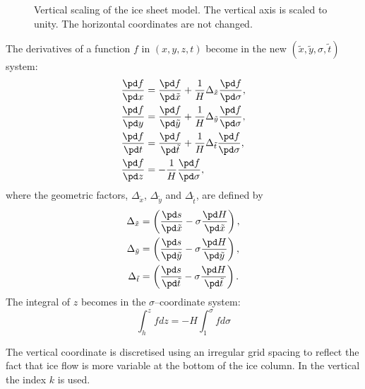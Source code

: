 \begin{figure}[htbp]
  \begin{center}
    
    \caption[Vertical scaling of the ice sheet model.]{Vertical scaling of the ice sheet model. The vertical axis is scaled to unity. The horizontal coordinates are not changed.}
    \label{kin.fig.scale}
  \end{center}
\end{figure}


The derivatives of a function $f$ in $(x,y,z,t)$ become in the new $(\tilde{x},\tilde{y},\sigma,\tilde{t})$ system:
\begin{subequations}
  \begin{align}
    \frac{\pd f}{\pd x} &= \frac{\pd f}{\pd\tilde{x}}+\frac1H\Delta_{\tilde{x}}\frac{\pd f}{\pd \sigma},\\
    \frac{\pd f}{\pd y} &= \frac{\pd f}{\pd\tilde{y}}+\frac1H\Delta_{\tilde{y}}\frac{\pd f}{\pd \sigma},\\
    \frac{\pd f}{\pd t} &= \frac{\pd f}{\pd\tilde{t}}+\frac1H\Delta_{\tilde{t}}\frac{\pd f}{\pd \sigma},\\
    \frac{\pd f}{\pd z} &= -\frac1H\frac{\pd f}{\pd\sigma},
  \end{align}
\end{subequations}
where  the geometric factors, $\Delta_{\tilde{x}}$, $\Delta_{\tilde{y}}$ and $\Delta_{\tilde{t}}$, are defined by
\begin{subequations}
  \begin{align}
  \Delta_{\tilde{x}}&=\left(\frac{\pd s}{\pd\tilde{x}}-\sigma\frac{\pd H}{\pd\tilde{x}}\right),\\
  \Delta_{\tilde{y}}&=\left(\frac{\pd s}{\pd\tilde{y}}-\sigma\frac{\pd H}{\pd\tilde{y}}\right),\\
  \Delta_{\tilde{t}}&=\left(\frac{\pd s}{\pd\tilde{t}}-\sigma\frac{\pd H}{\pd\tilde{t}}\right).
  \end{align}
\end{subequations}
The integral of $z$ becomes in the $\sigma$--coordinate system:
\begin{equation}
  \int_h^zfdz=-H\int_1^\sigma fd\sigma
\end{equation}

The vertical coordinate is discretised using an irregular grid spacing to reflect the fact that ice flow is more variable at the bottom of the ice column. In the vertical the index $k$ is used. 
